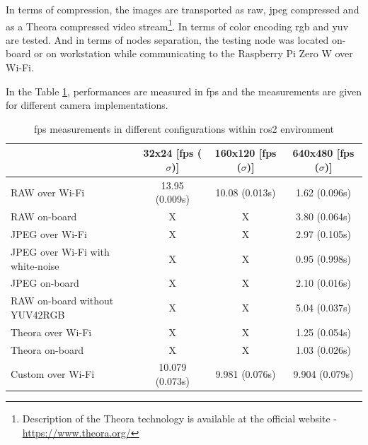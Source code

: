 In terms of compression, the images are transported as raw, \ac{jpeg} compressed and as a Theora compressed video stream\footnote{Description of the Theora technology is available at the official website - \url{https://www.theora.org/}}.
In terms of color encoding \ac{rgb} and \ac{yuv} are tested.
And in terms of nodes separation, the testing node was located on-board or on workstation while communicating to the Raspberry Pi Zero W over Wi-Fi.

In the Table \ref{tab:results:camera_perf}, performances are measured in \ac{fps} and the measurements are given for different camera implementations.

\begin{table}[H]
    \begin{adjustwidth}{-1.5in}{-1.5in} 
    \centering
    \begin{tabular}{|l|c|c|c|}
        \hline
         & 32x24 [\ac{fps} ($ \sigma $)] & 160x120 [\ac{fps} ($ \sigma $)] & 640x480 [\ac{fps} ($ \sigma $)] \\
         \hline
         RAW over Wi-Fi & 13.95 (0.009s) & 10.08 (0.013s) & 1.62 (0.096s) \\
         \hline
         RAW on-board & X & X & 3.80 (0.064s) \\
        \hline
        JPEG over Wi-Fi & X & X & 2.97 (0.105s) \\
        \hline
        JPEG over Wi-Fi with white-noise & X & X & 0.95 (0.998s) \\
        \hline
        JPEG on-board & X & X & 2.10 (0.016s) \\
        \hline
        RAW on-board without YUV42RGB & X & X & 5.04 (0.037s) \\
        \hline
        Theora over Wi-Fi & X & X & 1.25 (0.054s) \\
        \hline
        Theora on-board & X & X & 1.03 (0.026s) \\
        \hline
        Custom over Wi-Fi & 10.079 (0.073s) & 9.981 (0.076s) & 9.904 (0.079s) \\
        \hline
    \end{tabular}
    \end{adjustwidth}
    
    \caption{\ac{fps} measurements in different configurations within \ac{ros2} environment}
    \label{tab:results:camera_perf}
\end{table}

